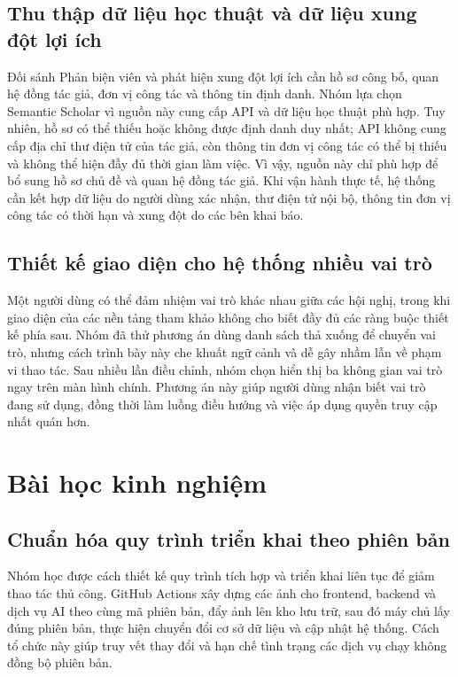 \subsection{Thu thập dữ liệu học thuật và dữ liệu xung đột lợi ích}

Đối sánh Phản biện viên và phát hiện xung đột lợi ích cần hồ sơ công bố, quan hệ đồng tác giả, đơn vị công tác và thông tin định danh. Nhóm lựa chọn Semantic Scholar vì nguồn này cung cấp API và dữ liệu học thuật phù hợp. Tuy nhiên, hồ sơ có thể thiếu hoặc không được định danh duy nhất; API không cung cấp địa chỉ thư điện tử của tác giả, còn thông tin đơn vị công tác có thể bị thiếu và không thể hiện đầy đủ thời gian làm việc. Vì vậy, nguồn này chỉ phù hợp để bổ sung hồ sơ chủ đề và quan hệ đồng tác giả. Khi vận hành thực tế, hệ thống cần kết hợp dữ liệu do người dùng xác nhận, thư điện tử nội bộ, thông tin đơn vị công tác có thời hạn và xung đột do các bên khai báo.

\subsection{Thiết kế giao diện cho hệ thống nhiều vai trò}

Một người dùng có thể đảm nhiệm vai trò khác nhau giữa các hội nghị, trong khi giao diện của các nền tảng tham khảo không cho biết đầy đủ các ràng buộc thiết kế phía sau. Nhóm đã thử phương án dùng danh sách thả xuống để chuyển vai trò, nhưng cách trình bày này che khuất ngữ cảnh và dễ gây nhầm lẫn về phạm vi thao tác. Sau nhiều lần điều chỉnh, nhóm chọn hiển thị ba không gian vai trò ngay trên màn hình chính. Phương án này giúp người dùng nhận biết vai trò đang sử dụng, đồng thời làm luồng điều hướng và việc áp dụng quyền truy cập nhất quán hơn.

\section{Bài học kinh nghiệm}

\subsection{Chuẩn hóa quy trình triển khai theo phiên bản}

Nhóm học được cách thiết kế quy trình tích hợp và triển khai liên tục để giảm thao tác thủ công. GitHub Actions xây dựng các ảnh cho frontend, backend và dịch vụ AI theo cùng mã phiên bản, đẩy ảnh lên kho lưu trữ, sau đó máy chủ lấy đúng phiên bản, thực hiện chuyển đổi cơ sở dữ liệu và cập nhật hệ thống. Cách tổ chức này giúp truy vết thay đổi và hạn chế tình trạng các dịch vụ chạy không đồng bộ phiên bản.

